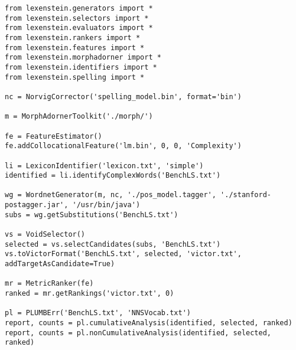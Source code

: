 \begin{lstlisting}
from lexenstein.generators import *
from lexenstein.selectors import *
from lexenstein.evaluators import *
from lexenstein.rankers import *
from lexenstein.features import *
from lexenstein.morphadorner import *
from lexenstein.identifiers import *
from lexenstein.spelling import *

nc = NorvigCorrector('spelling_model.bin', format='bin')

m = MorphAdornerToolkit('./morph/')

fe = FeatureEstimator()
fe.addCollocationalFeature('lm.bin', 0, 0, 'Complexity')

li = LexiconIdentifier('lexicon.txt', 'simple')
identified = li.identifyComplexWords('BenchLS.txt')

wg = WordnetGenerator(m, nc, './pos_model.tagger', './stanford-postagger.jar', '/usr/bin/java')
subs = wg.getSubstitutions('BenchLS.txt')

vs = VoidSelector()
selected = vs.selectCandidates(subs, 'BenchLS.txt')
vs.toVictorFormat('BenchLS.txt', selected, 'victor.txt', addTargetAsCandidate=True)

mr = MetricRanker(fe)
ranked = mr.getRankings('victor.txt', 0)

pl = PLUMBErr('BenchLS.txt', 'NNSVocab.txt')
report, counts = pl.cumulativeAnalysis(identified, selected, ranked)
report, counts = pl.nonCumulativeAnalysis(identified, selected, ranked)
\end{lstlisting}